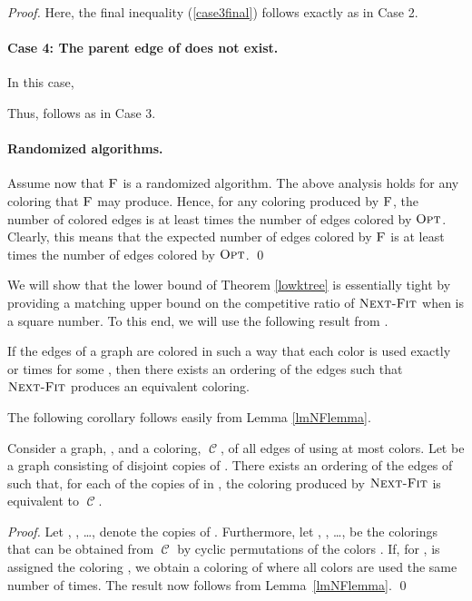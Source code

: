 \documentclass[smallextended]{svjour3}
\newcommand{\coloring}{\ensuremath{\operatorname{\mathscr{C}}}\xspace}
\newcommand{\NF}{\ensuremath{\operatorname{\textsc{Next-Fit}}}\xspace}
\newcommand{\OPT}{\ensuremath{\operatorname{\textsc{Opt}}}\xspace}
\newcommand{\FAIR}{\ensuremath{\operatorname{\textsc{F}}}\xspace}
\begin{document}
\begin{proof}
Here, 
the final inequality (\ref{case3final}) follows exactly as in Case 2.

\paragraph{Case 4: The parent edge of  does not exist.} 
In this case,
 
Thus,  follows as in Case 3.

\paragraph{Randomized algorithms.}
Assume now that \FAIR is a randomized algorithm.
The above analysis holds for any coloring that \FAIR may produce.
Hence, for any coloring produced by \FAIR, the number of colored edges
 is at least  times the number of edges
 colored by \OPT.
Clearly, this means that the expected number of edges colored by \FAIR
 is at least   times the number of edges
 colored by \OPT.
\qed\end{proof}

We will show that the lower bound of Theorem \ref{lowktree} is essentially tight by providing a matching upper bound on the competitive ratio of \NF when  is a square number. To this end, we will use the following result
 from \cite{kedge}.  
\begin{lemma}
If the edges of a graph are colored in such a way that each color is used exactly  or  times for some , then there exists an ordering of the edges such that \NF produces an equivalent coloring.
\label{lmNFlemma}
\end{lemma}

The following corollary follows easily from Lemma \ref{lmNFlemma}.

\begin{corollary}
\label{cor:next-fit}
Consider a graph, , and a coloring, \coloring, of all edges of  using
 at most  colors.
Let  be a graph consisting of  disjoint copies of . 
There exists an ordering of the edges of  such that, for each of
 the  copies of  in , the coloring produced by \NF is
 equivalent to \coloring.
\label{corolNF}
\end{corollary}

\begin{proof}
Let , , \ldots,  denote the  copies of .
Furthermore, let , , \ldots, 
 be the  colorings that can be obtained from \coloring by cyclic
 permutations of the colors .
If, for ,  is assigned the coloring
 , we obtain a coloring of  where all colors are used
 the same number of times.
The result now follows from Lemma~\ref{lmNFlemma}.
\qed\end{proof}
\end{document}
